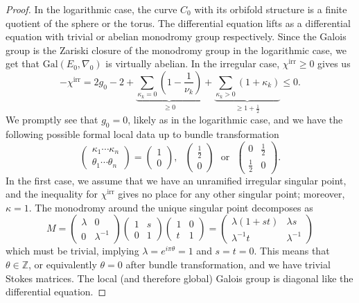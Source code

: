 \documentclass[12]{amsart}
\begin{document}
\begin{proof}In the logarithmic case, the curve $C_0$ with its orbifold  structure is a finite quotient of 
the sphere or the torus. The differential equation lifts as a differential equation with trivial or abelian 
monodromy group respectively. Since the Galois group is the Zariski closure of the monodromy 
group in the logarithmic case, we get that $\mathrm{Gal}(E_0,\nabla_0)$ is virtually abelian.
In the irregular case, $\chi^{\mathrm{irr}}\ge0$ gives us
$$-\chi^{\mathrm{irr}}=2g_0-2+\underbrace{\sum_{\kappa_k=0}(1-\frac{1}{\nu_k})}_{\ge 0}
+\underbrace{\sum_{\kappa_k>0}(1+\kappa_k)}_{\ge 1+\frac{1}{2}}\le0.$$
We promptly see that $g_0=0$, likely as in the logarithmic case, and we have 
the following possible formal local data up to bundle transformation
$$\begin{pmatrix}\kappa_1\cdots \kappa_n\\ \theta_1\cdots \theta_n\end{pmatrix}=\begin{pmatrix}1\\ 0\end{pmatrix},\ \ \ 
\begin{pmatrix}\frac{1}{2}\\ 0\end{pmatrix}\ \ \ \text{or}\ \ \ \begin{pmatrix}0&\frac{1}{2}\\ \frac{1}{2}&0\end{pmatrix}.$$
In the first case, we assume that we have an unramified irregular singular point, and the inequality
for $\chi^{\mathrm{irr}}$ gives no place for any other singular point; moreover, $\kappa=1$. 
The monodromy around the unique singular point decomposes as
$$M=
\begin{pmatrix}\lambda&0\\ 0&\lambda^{-1}\end{pmatrix}
\begin{pmatrix}1&s\\ 0&1\end{pmatrix}\begin{pmatrix}1&0\\ t&1\end{pmatrix}=\begin{pmatrix}\lambda(1+st)&\lambda s\\ \lambda^{-1}t&\lambda^{-1}\end{pmatrix}$$
which must be trivial, implying $\lambda=e^{i\pi\theta}=1$ and $s=t=0$. This means that $\theta\in\mathbb Z$,
or equivalently $\theta=0$ after bundle transformation, and we have trivial Stokes matrices. 
The local (and therefore global) Galois group is diagonal like the differential equation.


\end{proof}
\end{document}
